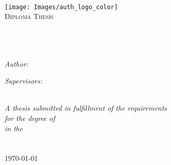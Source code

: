 \documentclass[11pt, oneside ]{Thesis} %
\begin{document}
\begin{titlepage}
\begin{center}

\textsc{\LARGE \univname}\\[0.5cm] %
\texttt{[image: Images/auth\_logo\_color]}\\[1.5cm] %
\textsc{\Large Diploma Thesis}\\[0.5cm] %

\HRule \\[0.4cm] %
{\huge \bfseries \ttitle}\\[0.4cm] %
\HRule \\[1.5cm] %
 
\begin{minipage}{0.45\textwidth}
\begin{flushleft} \large
\emph{Author:}\\
\href{}{\authornames} %
\end{flushleft}
\end{minipage}
\begin{minipage}{0.45\textwidth}
\begin{flushright} \large
\emph{Supervisors:} \\
\href{}{\supname} %
\end{flushright}
\end{minipage}\\[3cm]
 
\large \textit{A thesis submitted in fulfillment of the requirements\\ for the degree of \degreename}\\[0.3cm] %
\textit{in the}\\[0.4cm]
\groupname\\\deptname\\[2cm] %
 
{\large \today}\\[4cm] %
 
\vfill
\end{center}

\end{titlepage}

\end{document}
